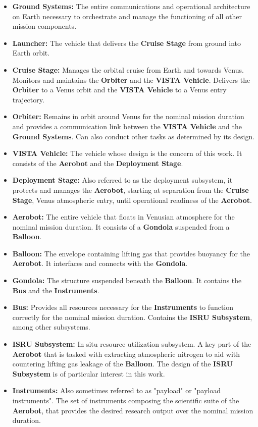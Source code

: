 \begin{itemize}
    \setlength{\itemsep}{1pt}   %
    \setlength{\parskip}{1pt}   %
    \setlength{\parsep}{1pt}    %
    \item \textbf{Ground Systems:} The entire communications and operational architecture on Earth necessary to orchestrate and manage the functioning of all other mission components.
    \item \textbf{Launcher:} The vehicle that delivers the \textbf{Cruise Stage} from ground into Earth orbit.
    \item \textbf{Cruise Stage:} Manages the orbital cruise from Earth and towards Venus. Monitors and maintains the \textbf{Orbiter} and the \textbf{VISTA Vehicle}. Delivers the \textbf{Orbiter} to a Venus orbit and the \textbf{VISTA Vehicle} to a Venus entry trajectory.
    \item \textbf{Orbiter:} Remains in orbit around Venus for the nominal mission duration and provides a communication link between the \textbf{VISTA Vehicle} and the \textbf{Ground Systems}. Can also conduct other tasks as determined by its design.
    \item \textbf{VISTA Vehicle:} The vehicle whose design is the concern of this work. It consists of the \textbf{Aerobot} and the \textbf{Deployment Stage}.
    \item \textbf{Deployment Stage:} Also referred to as the deployment subsystem, it protects and manages the \textbf{Aerobot}, starting at separation from the \textbf{Cruise Stage}, Venus atmospheric entry, until operational readiness of the \textbf{Aerobot}.
    \item \textbf{Aerobot:} The entire vehicle that floats in Venusian atmosphere for the nominal mission duration. It consists of a \textbf{Gondola} suspended from a \textbf{Balloon}.
    \item \textbf{Balloon:} The envelope containing lifting gas that provides buoyancy for the \textbf{Aerobot}. It interfaces and connects with the \textbf{Gondola}.  
    \item \textbf{Gondola:} The structure suspended beneath the \textbf{Balloon}. It contains the \textbf{Bus} and the \textbf{Instruments}.
    \item \textbf{Bus:} Provides all resources necessary for the \textbf{Instruments} to function correctly for the nominal mission duration. Contains the \textbf{ISRU Subsystem}, among other subsystems.
    \item \textbf{ISRU Subsystem:} In situ resource utilization subsystem. A key part of the \textbf{Aerobot} that is tasked with extracting atmospheric nitrogen to aid with countering lifting gas leakage of the \textbf{Balloon}. The design of the \textbf{ISRU Subsystem} is of particular interest in this work.
    \item \textbf{Instruments:} Also sometimes referred to as "payload" or "payload instruments". The set of instruments composing the scientific suite of the \textbf{Aerobot}, that provides the desired research output over the nominal mission duration.
\end{itemize}


